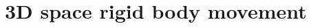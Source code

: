 \documentclass{report}
\begin{document}
\chapter{3D space rigid body movement}
\label{cpt: 3}



\newpage



\newpage



\newpage



\newpage



\newpage



\newpage
\end{document}
